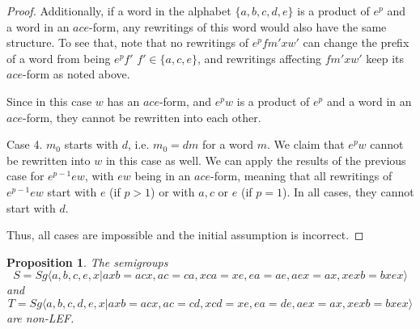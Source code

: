 \documentclass{article}
\newtheorem{proposition}{Proposition}
\theoremstyle{definition}
\begin{document}
\begin{proof}
Additionally, if a word in the alphabet $\{a,b,c,d,e\}$ is a product of $e^p$ and a word in an $ace$-form, any rewritings of this word would also have the same structure. To see that, note that no rewritings of $e^p f m' x w'$ can change the prefix of a word from being $e^p f'$ $f' \in \{a,c,e\}$, and rewritings affecting $f m' x w'$ keep its $ace$-form as noted above.

Since in this case $w$ has an $ace$-form, and $e^p w$ is a product of $e^p$ and a word in an $ace$-form, they cannot be rewritten into each other.

Case 4. $m_0$ starts with $d$, i.e. $m_0 = dm$ for a word $m$. We claim that $e^p w$ cannot be rewritten into $w$ in this case as well. We can apply the results of the previous case for $e^{p-1} ew$, with $ew$ being in an $ace$-form, meaning that all rewritings of $e^{p-1} ew$ start with $e$ (if $p > 1$) or with $a,c$ or $e$ (if $p=1$). In all cases, they cannot start with $d$.

Thus, all cases are impossible and the initial assumption is incorrect.

\end{proof}



\begin{proposition}\label{prop_bigjcon}
The semigroups $$S = Sg \langle a,b,c,e,x | axb = acx, ac = ca, xca = xe, ea = ae, aex = ax, xexb = bxex \rangle$$ and $$T = Sg \langle a,b,c,d,e,x | axb = acx, ac = cd, xcd = xe, ea = de, aex = ax, xexb = bxex \rangle$$ are non-LEF.
\end{proposition}
\end{document}

